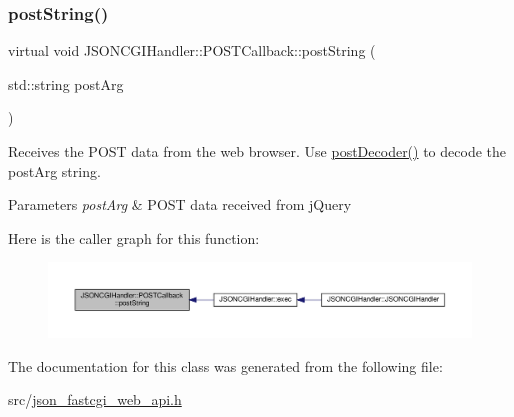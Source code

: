 \subsubsection{\texorpdfstring{post\+String()}{postString()}}
{\footnotesize\ttfamily virtual void J\+S\+O\+N\+C\+G\+I\+Handler\+::\+P\+O\+S\+T\+Callback\+::post\+String (\begin{DoxyParamCaption}\item[{std\+::string}]{post\+Arg }\end{DoxyParamCaption})\hspace{0.3cm}{\ttfamily [pure virtual]}}

Receives the P\+O\+ST data from the web browser. Use \hyperlink{classJSONCGIHandler_a0f208af3dd050ed182967fe9cca42d78}{post\+Decoder()} to decode the post\+Arg string. 
\begin{DoxyParams}{Parameters}
{\em post\+Arg} & P\+O\+ST data received from j\+Query \\
\hline
\end{DoxyParams}
Here is the caller graph for this function\+:
\nopagebreak
\begin{figure}[H]
\begin{center}
\leavevmode
\includegraphics[width=350pt]{classJSONCGIHandler_1_1POSTCallback_a6cddb384a3fd9242b323cea3d82a6bb7_icgraph}
\end{center}
\end{figure}


The documentation for this class was generated from the following file\+:\begin{DoxyCompactItemize}
\item 
src/\hyperlink{json__fastcgi__web__api_8h}{json\+\_\+fastcgi\+\_\+web\+\_\+api.\+h}\end{DoxyCompactItemize}

